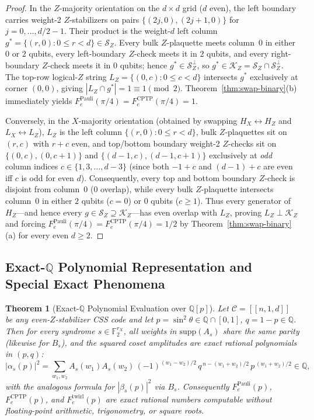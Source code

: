 \documentclass[11pt,a4paper]{article}
\theoremstyle{plain}
\newtheorem{theorem}{Theorem}[section]
\theoremstyle{definition}
\newcommand{\Ftwo}{\mathbb{F}_2}
\newcommand{\Q}{\mathbb{Q}}
\newcommand{\SZ}{\mathcal{S}_Z}
\newcommand{\KZ}{\mathcal{K}_Z}
\begin{document}
\begin{proof}
In the $Z$-majority orientation on the $d \times d$ grid ($d$ even), the left boundary carries weight-2 $Z$-stabilizers on pairs $\{(2j, 0), (2j+1, 0)\}$ for $j = 0, \dots, d/2 - 1$. Their product is the weight-$d$ left column $g^* = \{(r,0) : 0 \le r < d\} \in \SZ$. Every bulk $Z$-plaquette meets column~$0$ in either $0$ or $2$ qubits, every left-boundary $Z$-check meets it in $2$ qubits, and every right-boundary $Z$-check meets it in $0$ qubits; hence $g^* \in \SZ^\perp$, so $g^* \in \KZ = \SZ \cap \SZ^\perp$. The top-row logical-$Z$ string $L_Z = \{(0, c) : 0 \le c < d\}$ intersects $g^*$ exclusively at corner $(0,0)$, giving $|L_Z \cap g^*| = 1 \equiv 1 \pmod 2$. Theorem~\ref{thm:swap-binary}(b) immediately yields $F_e^{\mathrm{Pauli}}(\pi/4) = F_e^{\mathrm{CPTP}}(\pi/4) = 1$.

Conversely, in the $X$-majority orientation (obtained by swapping $H_X \leftrightarrow H_Z$ and $L_X \leftrightarrow L_Z$), $L_Z$ is the left column $\{(r, 0) : 0 \le r < d\}$, bulk $Z$-plaquettes sit on $(r,c)$ with $r+c$ even, and top/bottom boundary weight-2 $Z$-checks sit on $\{(0, c), (0, c+1)\}$ and $\{(d-1, c), (d-1, c+1)\}$ exclusively at \emph{odd} column indices $c \in \{1, 3, \dots, d-3\}$ (since both $-1+c$ and $(d-1)+c$ are even iff $c$ is odd for even $d$). Consequently, every top and bottom boundary $Z$-check is disjoint from column~$0$ ($0$ overlap), while every bulk $Z$-plaquette intersects column~$0$ in either $2$ qubits ($c=0$) or $0$ qubits ($c \ge 1$). Thus every generator of $H_Z$---and hence every $g \in \SZ \supseteq \KZ$---has even overlap with $L_Z$, proving $L_Z \perp \KZ$ and forcing $F_e^{\mathrm{Pauli}}(\pi/4) = F_e^{\mathrm{CPTP}}(\pi/4) = 1/2$ by Theorem~\ref{thm:swap-binary}(a) for every even $d \ge 2$.
\end{proof}

\subsection{Exact-\texorpdfstring{$\mathbb{Q}$}{Q} Polynomial Representation and Special Exact Phenomena}

\begin{theorem}[Exact-$\Q$ Polynomial Evaluation over {$\Q[p]$}]
\label{thm:exact-Q-poly}
Let $\mathcal{C} = [[n,1,d]]$ be any even-$Z$-stabilizer CSS code and let $p = \sin^2\theta \in \Q \cap [0,1]$, $q = 1 - p \in \Q$. Then for every syndrome $s \in \Ftwo^{r_X}$, all weights in $\mathrm{supp}(A_s)$ share the same parity (likewise for $B_s$), and the squared coset amplitudes are exact rational polynomials in $(p,q)$:
\begin{equation}
  |\alpha_s(p)|^2 = \sum_{w_1, w_2} A_s(w_1) A_s(w_2)\, (-1)^{(w_1 - w_2)/2}\, q^{\,n - (w_1+w_2)/2}\, p^{\,(w_1+w_2)/2} \in \Q,
  \label{eq:exact-Q}
\end{equation}
with the analogous formula for $|\beta_s(p)|^2$ via $B_s$. Consequently $F_e^{\mathrm{Pauli}}(p)$, $F_e^{\mathrm{CPTP}}(p)$, and $F_e^{\mathrm{twirl}}(p)$ are exact rational numbers computable without floating-point arithmetic, trigonometry, or square roots.
\end{theorem}
\end{document}

